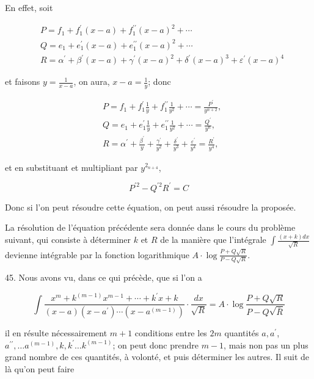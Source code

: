 \documentclass{article}
\begin{document}
En effet, soit

\[
\begin{aligned}
& P=f_{1}+f_{1}^{\prime}(x-a)+f_{1}^{\prime \prime}(x-a)^{2}+\cdots \\
& Q=e_{1}+e_{1}^{\prime}(x-a)+e_{1}^{\prime \prime}(x-a)^{2}+\cdots \\
& R=\alpha^{\prime}+\beta^{\prime}(x-a)+\gamma^{\prime}(x-a)^{2}+\delta^{\prime}(x-a)^{3}+\varepsilon^{\prime}(x-a)^{4}
\end{aligned}
\]

et faisons \(y=\frac{1}{x-a}\), on aura, \(x-a=\frac{1}{y}\); donc

\[
\begin{aligned}
& P=f_{1}+f_{1}^{\prime} \frac{1}{y}+f_{1}^{\prime \prime} \frac{1}{y^{2}}+\cdots=\frac{P^{\prime}}{y^{n+2}}, \\
& Q=e_{1}+e_{1}^{\prime} \frac{1}{y}+e_{1}^{\prime \prime} \frac{1}{y^{2}}+\cdots=\frac{Q^{\prime}}{y^{n}}, \\
& R=\alpha^{\prime}+\frac{\beta^{\prime}}{y}+\frac{\gamma^{\prime}}{y^{2}}+\frac{\delta^{\prime}}{y^{3}}+\frac{\varepsilon^{\prime}}{y^{4}}=\frac{R^{\prime}}{y^{4}},
\end{aligned}
\]

et en substituant et multipliant par \(y^{2_{n+4}}\),

\[
P^{\prime 2}-Q^{\prime 2} R^{\prime}=C
\]

Donc si l'on peut résoudre cette équation, on peut aussi résoudre la proposée.

La résolution de l'équation précédente sera donnée dans le cours du problème suivant, qui consiste à déterminer \(k\) et \(R\) de la manière que l'intégrale \(\int \frac{(x+k) d x}{\sqrt{R}}\) devienne intégrable par la fonction logarithmique \(A \cdot \log \frac{P+Q \sqrt{R}}{P-Q \sqrt{R}}\).

45. Nous avons vu, dans ce qui précède, que si l'on a

\[
\int \frac{x^{m}+k^{(m-1)} x^{m-1}+\cdots+k^{\prime} x+k}{(x-a)\left(x-a^{\prime}\right) \cdots\left(x-a^{(m-1)}\right)} \cdot \frac{d x}{\sqrt{R}}=A \cdot \log \frac{P+Q \sqrt{R}}{P-Q \sqrt{\bar{R}}}
\]

il en résulte nécessairement \(m+1\) conditions entre les \(2 m\) quantités \(a, a^{\prime}\), \(a^{\prime \prime}, \ldots a^{(m-1)}, k, k^{\prime} \ldots k^{(m-1)}\); on peut donc prendre \(m-1\), mais non pas un plus grand nombre de ces quantités, à volonté, et puis déterminer les autres. Il suit de là qu'on peut faire
\end{document}
